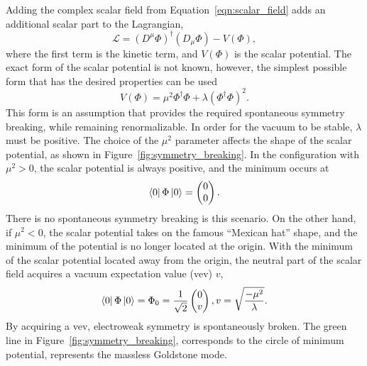 Adding the complex scalar field from Equation~\ref{eqn:scalar_field} adds an
additional scalar part to the Lagrangian,
\begin{equation}
  \mathcal{L} =
  \left(D^{\mu}\Phi\right)^{\dagger}\left(D_{\mu}\Phi\right) - V(\Phi),
  \label{eqn:scalar_lagrangian}
\end{equation}
where the first term is the kinetic term, and $V(\Phi)$ is the scalar
potential.
The exact form of the scalar potential is not known, however, the simplest
possible form that has the desired properties can be used
\begin{equation}
  V(\Phi) = \mu^2 \Phi^{\dagger}\Phi + \lambda\left(\Phi^{\dagger}\Phi\right)^2.
\end{equation}
This form is an assumption that provides the required spontaneous symmetry
breaking, while remaining renormalizable.
In order for the vacuum to be stable, $\lambda$ must be positive.
The choice of the $\mu^2$ parameter affects the shape of the scalar potential,
as shown in Figure~\ref{fig:symmetry_breaking}.
In the configuration with $\mu^2 > 0$, the scalar potential is always positive,
and the minimum occurs at
\begin{equation}
  \bra{0} \Phi \ket{0} = \begin{pmatrix} 0 \\ 0 \end{pmatrix}.
\end{equation}
There is no spontaneous symmetry breaking is this scenario.
On the other hand, if $\mu^2 < 0$, the scalar potential takes on the famous
``Mexican hat'' shape, and the minimum of the potential is no longer located at
the origin.
With the minimum of the scalar potential located away from the origin, the
neutral part of the scalar field acquires a vacuum expectation value (vev) $v$,
\begin{equation}
  \bra{0} \Phi \ket{0} =
  \Phi_0 =
  \frac{1}{\sqrt{2}} \begin{pmatrix} 0 \\ v \end{pmatrix},
  v = \sqrt{\frac{-\mu^2}{\lambda}}.
\end{equation}
By acquiring a vev, electroweak symmetry is spontaneously broken.
The green line in Figure~\ref{fig:symmetry_breaking}, corresponds to the
circle of minimum potential, represents the massless Goldstone mode.

